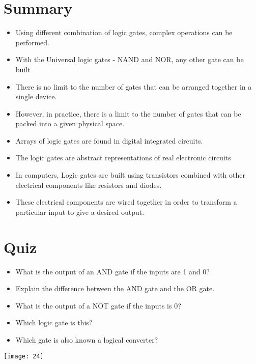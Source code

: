 \documentclass{article}
\begin{document}
\section{Summary}
\begin{itemize}
	\item Using different combination of logic gates, complex operations can be performed. 
	\item With the Universal logic gates - NAND and NOR, any other gate can be built
	\item There is no limit to the number of gates that can be arranged together in a single device. 
	\item However, in practice, there is a limit to the number of gates that can be packed into a given physical space. 
	\item Arrays of logic gates are found in digital integrated circuits.
	\item The logic gates are abstract representations of real electronic circuits
	\item In computers, Logic gates are built using transistors combined with other electrical components like resistors and diodes. 
	\item These electrical components are wired together in order to transform a particular input to give a desired output. \cite{108}
\end{itemize}

\section{Quiz}

\begin{itemize}
	
	\item What is the output of an AND gate if the inputs are 1 and 0?
	\item Explain the difference between the AND gate and the OR gate.
	\item What is the output of a NOT gate if the inputs is 0?
	\item Which logic gate is this?
	\item Which gate is also known 
	a logical converter?
	
\end{itemize}

\centering\texttt{[image: 24]}

\newpage


\end{document}
